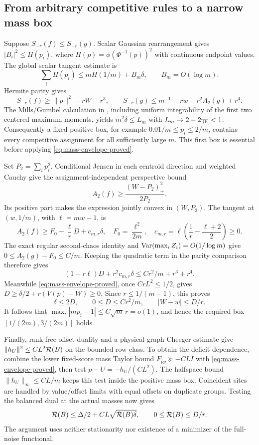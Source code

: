 \subsection{From arbitrary competitive rules to a narrow mass box}
Suppose $S_{-r}(f)\le S_{-r}(g)$. Scalar Gaussian rearrangement gives
$|B_i|^2\le H(p_i)$, where $H(p)=\phi(\Phi^{-1}(p))^2$ with continuous
endpoint values. The global scalar tangent estimate is
\[
 \sum_iH(p_i)\le mH(1/m)+B_m\delta,\qquad B_m=O(\log m).
\]
Hermite parity gives
\[
 S_{-r}(f)\ge\|p\|^2-rW-r^3,\qquad
 S_{-r}(g)\le m^{-1}-rw+r^2A_2(g)+r^4.
\]
The Mills/Gumbel calculation in \cite{localization}, including uniform
integrability of the first two centered maximum moments, yields
$m^2\delta\le L_m$ with $L_m\to2-2\gamma_{\rm E}<1$.
Consequently a fixed positive box, for example
$0.01/m\le p_i\le2/m$, contains every competitive assignment for all
sufficiently large $m$. This first box is essential before applying
\eqref{eq:mass-envelope-proved}.

Set $P_2=\sum_i p_i^2$. Conditional Jensen in each centroid direction
and weighted Cauchy give the assignment-independent perspective bound
\begin{equation}\label{eq:positive-perspective}
 A_2(f)\ge\frac{(W-P_2)_+^2}{2P_2}.
\end{equation}
Its positive part makes the expression jointly convex in $(W,P_2)$.
The tangent at $(w,1/m)$, with $\ell=mw-1$, is
\[
 A_2(f)\ge F_0-\frac\ell rD+c_{m,r}\delta,
 \quad F_0=\frac{\ell^2}{2m},\quad
 c_{m,r}=\ell\left(\frac1r-\frac{\ell+2}{2}\right)\ge0.
\]
The exact regular second-chaos identity and
$\operatorname{Var}(\max_i Z_i)=O(1/\log m)$ give
$0\le A_2(g)-F_0\le C/m$. Keeping the quadratic term in the parity
comparison therefore gives
\[
 (1-r\ell)D+r^2c_{m,r}\delta\le Cr^2/m+r^3+r^4.
\]
Meanwhile \eqref{eq:mass-envelope-proved}, once $CrL^2\le1/2$, gives
$D\ge\delta/2+r(V(p)-W)\ge0$. Since $r\le1/(m-1)$, this proves
\begin{equation}\label{eq:localized-proved}
 \delta\le2D,\qquad 0\le D\le Cr^2/m,
 \qquad |W-w|\le D/r.
\end{equation}
It follows that $\max_i|mp_i-1|\le C\sqrt m\,r=o(1)$, and hence
the required box $[1/(2m),3/(2m)]$ holds.

Finally, rank-free offset duality and a physical-graph Cheeger estimate
give $\|h_U\|^2\le CL^2\mathcal R(B)$ on the bounded row class. To obtain
the deficit dependence, combine the lower fixed-score mass Taylor bound
$F_{pp}\succeq-CL I$ with \eqref{eq:mass-envelope-proved}, then test
$p-U=-h_U/(CL^2)$. The halfspace bound $\|h_U\|_\infty\le CL/m$
keeps this test inside the positive mass box. Coincident sites are handled
by value/offset limits with equal offsets on duplicate groups. Testing
the balanced dual at the actual masses now gives
\[
 \mathcal R(B)\le\Delta/2+CL\sqrt{\mathcal R(B)\delta},\qquad
                    0\le\mathcal R(B)\le D/r.
\]
The argument uses neither stationarity nor existence of a minimizer of
the full-noise functional.
